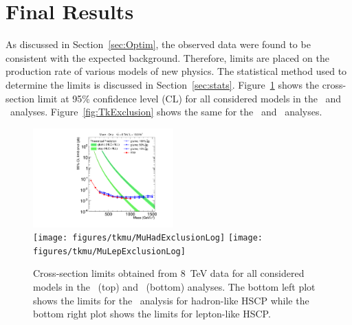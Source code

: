 \section{Final Results}
As discussed in Section~\ref{sec:Optim}, the observed data were found to be consistent with the expected background.
Therefore, limits are placed on the production rate of various models of new physics. The statistical method used to determine the limits is discussed in
Section~\ref{sec:stats}. Figure~\ref{fig:MuExclusion}
shows the cross-section limit at 95\% confidence level (CL) for all considered models in the \muononly\ and \tktof\ analyses.
Figure~\ref{fig:TkExclusion} shows the same for the \tkonly\ and \multi\ analyses.

\begin{figure}
\centering
  \includegraphics[clip=false, trim=0.0cm 0cm 0.0cm 0cm, width=0.48\textwidth]{figures/muonly/MOExclusionLog} \\
  \texttt{[image: figures/tkmu/MuHadExclusionLog]}
  \texttt{[image: figures/tkmu/MuLepExclusionLog]} \\
\caption[Cross-section limits obtained from 8~TeV data for all considered models in the \muononly\ and \tktof\ analyses]
{Cross-section limits obtained from 8~TeV data for all considered models in the \muononly\ (top) and \tktof\ (bottom) analyses.
The bottom left plot shows the limits for the \tktof\ analysis for hadron-like HSCP while the bottom right plot shows the limits for lepton-like HSCP.
}
    \label{fig:MuExclusion}
\end{figure}

